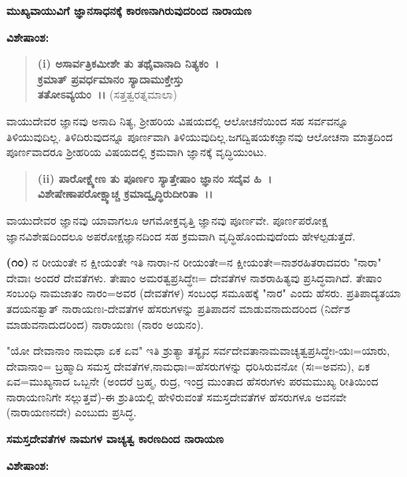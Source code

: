 \begin{center}
\textbf{ಮುಖ್ಯವಾಯುವಿಗೆ ಜ್ಞಾನಸಾಧನಕ್ಕೆ ಕಾರಣನಾಗಿರುವುದರಿಂದ ನಾರಾಯಣ}
\end{center}

\noindent
\textbf{ವಿಶೇಷಾಂಶ:\enginline{-}}

\begin{verse}
\textbf{(i) ಅಸಾರ್ವತ್ರಿಕಮೀಶೇ ತು ತಥೈವಾನಾದಿ ನಿತ್ಯಕಂ~।}\\\textbf{ಕ್ರಮಾತ್ ಪ್ರವರ್ಧಮಾನಂ ಸ್ಯಾದಾಮುಕ್ತೇಸ್ತು}\\\textbf{ತತೋಽವ್ಯಯಂ~।।} (ಸತ್ತತ್ವರತ್ನಮಾಲಾ)
\end{verse}

\noindent
ವಾಯುದೇವರ ಜ್ಞಾನವು ಅನಾದಿ ನಿತ್ಯ, ಶ‍್ರೀಹರಿಯ ವಿಷಯದಲ್ಲಿ ಆಲೋಚನೆಯಿಂದ ಸಹ ಸರ್ವವನ್ನೂ ತಿಳಿಯುವುದಿಲ್ಲ. ತಿಳಿದಿರುವುದನ್ನೂ ಪೂರ್ಣವಾಗಿ ತಿಳಿಯುವುದಿಲ್ಲ.\break ಜಗದ್ವಿಷಯಕಜ್ಞಾನವು ಆಲೋಚನಾ ಮಾತ್ರದಿಂದ ಪೂರ್ಣವಾದರೂ ಶ‍್ರೀಹರಿಯ ವಿಷಯದಲ್ಲಿ ಕ್ರಮವಾಗಿ ಜ್ಞಾನಕ್ಕೆ ವೃದ್ಧಿಯುಂಟು.

\begin{verse}
\textbf{(ii) ಪಾರೋಕ್ಷ್ಯೇಣ ತು ಪೂರ್ಣಂ ಸ್ಯಾತ್ತೇಷಾಂ ಜ್ಞಾನಂ ಸದೈವ ಹಿ~।}\\\textbf{ವಿಶೇಷೇಣಾಪರೋಕ್ಷ್ಯಾಚ್ಚ ಕ್ರಮಾದ್ವೃದ್ಧಿರುದೀರಿತಾ~।।}
\end{verse}


\noindent
ವಾಯುದೇವರ ಜ್ಞಾನವು ಯಾವಾಗಲೂ ಆಗಮೋಕ್ತವೃತ್ತಿ ಜ್ಞಾನವು ಪೂರ್ಣವೇ. ಪೂರ್ಣಪರೋಕ್ಷ ಜ್ಞಾನವಿಶೇಷದಿಂದಲೂ ಅಪರೋಕ್ಷಜ್ಞಾನದಿಂದ ಸಹ ಕ್ರಮವಾಗಿ ವೃದ್ಧಿಹೊಂದುವುದೆಂದು ಹೇಳಲ್ಪಡುತ್ತದೆ.

\textbf{(೧೦)} ನ ರೀಯಂತೇ ನ ಕ್ಷೀಯಂತೇ ಇತಿ ನಾರಾಃ-ನ ರೀಯಂತೇ=ನ ಕ್ಷೀಯಂತೇ=ನಾಶ\-ರಹಿತರಾದವರು "ನಾರಾ" ದೇವಾಃ ಅಂದರೆ ದೇವತೆಗಳು. ತೇಷಾಂ ಅಮರತ್ವಪ್ರಸಿದ್ಧೇಃ= ದೇವತೆಗಳ ನಾಶರಾಹಿತ್ಯವು ಪ್ರಸಿದ್ಧವಾಗಿದೆ. ತೇಷಾಂ ಸಂಬಂಧಿ ನಾಮಜಾತಂ ನಾರಂ=ಅವರ (ದೇವತೆಗಳ) ಸಂಬಂಧ ಸಮೂಹಕ್ಕೆ "ನಾರ" ಎಂದು ಹೆಸರು. ಪ್ರತಿಪಾದ್ಯತಯಾ ತದಯನತ್ವಾತ್ ನಾರಾಯಣಃ-ದೇವತೆಗಳ ಹೆಸರುಗಳನ್ನು ಪ್ರತಿಪಾದನೆ ಮಾಡುವನಾದುದರಿಂದ (ನಿರ್ದೆಶ ಮಾಡುವನಾದುದರಿಂದ) ನಾರಾಯಣಃ (ನಾರಂ ಅಯನಂ).

"ಯೋ ದೇವಾನಾಂ ನಾಮಧಾ ಏಕ ಏವ" ಇತಿ ಶ್ರುತ್ಯಾ ತಸ್ಯೈವ ಸರ್ವದೇವತಾ\break ನಾಮವಾಚ್ಯತ್ವಪ್ರಸಿದ್ಧೇಃ-ಯಃ=ಯಾರು, ದೇವಾನಾಂ= ಬ್ರಹ್ಮಾದಿ ಸಮಸ್ತ ದೇವತೆಗಳ,\break ನಾಮಧಾಃ=ಹೆಸರುಗಳನ್ನು ಧರಿಸಿರುವನೋ (ಸಃ=ಅವನು), ಏಕ ಏವ=ಮುಖ್ಯನಾದ ಒಬ್ಬನೇ (ಅಂದರೆ ಬ್ರಹ್ಮ, ರುದ್ರ, ಇಂದ್ರ ಮುಂತಾದ ಹೆಸರುಗಳು ಪರಮಮುಖ್ಯ ರೀತಿಯಿಂದ ನಾರಾಯಣನಿಗೇ ಸಲ್ಲುತ್ತವೆ)-ಈ ಶ್ರುತಿಯಲ್ಲಿ ಹೇಳಿರುವಂತೆ ಸಮಸ್ತದೇವತೆಗಳ ಹೆಸರುಗಳೂ ಅವನವೇ (ನಾರಾಯಣನದೇ) ಎಂಬುದು ಪ್ರಸಿದ್ಧ.

\begin{center}
\textbf{ಸಮಸ್ತದೇವತೆಗಳ ನಾಮಗಳ ವಾಚ್ಯತ್ವ ಕಾರಣದಿಂದ ನಾರಾಯಣ}
\end{center}

\noindent
\textbf{ವಿಶೇಷಾಂಶ:\enginline{-}}


